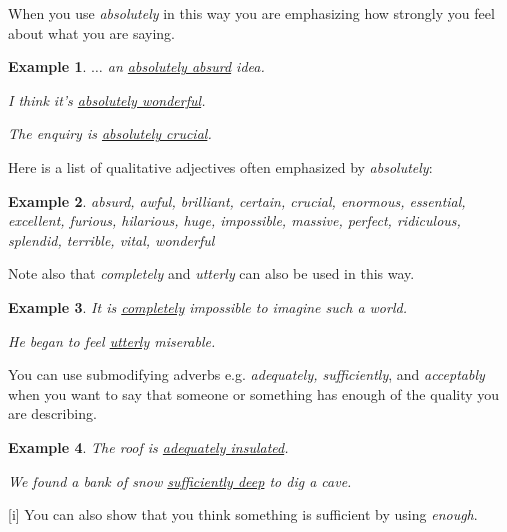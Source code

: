 \documentclass[oneside]{book}
\numberwithin{equation}{section}
\newtheorem{example}{Example}[section]
\begin{document}
When you use \textit{absolutely} in this way you are emphasizing how strongly you feel about what you are saying.
\begin{example}
    $\ldots$ an \underline{absolutely absurd} idea.
    
    I think it's \underline{absolutely wonderful}.
    
    The enquiry is \underline{absolutely crucial}.
\end{example}
Here is a list of qualitative adjectives often emphasized by \textit{absolutely}:
\begin{example}
    absurd, awful, brilliant, certain, crucial, enormous, essential, excellent, furious, hilarious, huge, impossible, massive, perfect, ridiculous, splendid, terrible, vital, wonderful
\end{example}
Note also that \textit{completely} and \textit{utterly} can also be used in this way.
\begin{example}
    It is \underline{completely} impossible to imagine such a world.
    
    He began to feel \underline{utterly} miserable.
\end{example}
%
\noindent{} You can use submodifying adverbs e.g. \textit{adequately, sufficiently}, and \textit{acceptably} when you want to say that someone or something has enough of the quality you are describing.
\begin{example}
    The roof is \underline{adequately insulated}.
    
    We found a bank of snow \underline{sufficiently deep} to dig a cave.
\end{example}
%
\noindent{} [i] You can also show that you think something is sufficient by using \textit{enough}.
\end{document}
